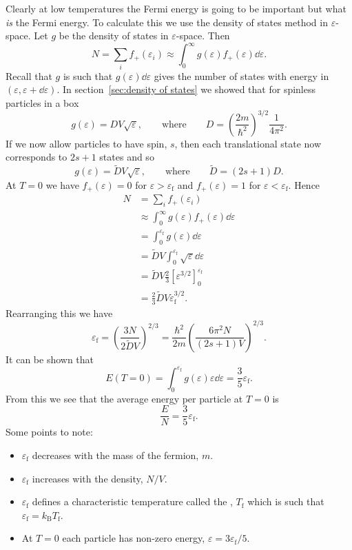 \documentclass[a4paper]{article}
\newcommand{\boltzmann}{k_\mathrm{B}}
\newcommand{\fermiEnergy}{\varepsilon_{\mathrm{f}}}
\newcommand{\fermiTemp}{T_{\mathrm{f}}}
\begin{document}
    Clearly at low temperatures the Fermi energy is going to be important but what \emph{is} the Fermi energy.
    To calculate this we use the density of states method in \(\varepsilon\)-space.
    Let \(g\) be the density of states in \(\varepsilon\)-space.
    Then
    \[N = \sum_i f_{+}(\varepsilon_i) \approx \int_{0}^{\infty} g(\varepsilon) f_{+}(\varepsilon) \dd{\varepsilon}.\]
    Recall that \(g\) is such that \(g(\varepsilon)\dd{\varepsilon}\) gives the number of states with energy in \((\varepsilon, \varepsilon + \dd{\varepsilon})\).
    In section~\ref{sec:density of states} we showed that for spinless particles in a box
    \[g(\varepsilon) = DV\sqrt{\varepsilon}, \qquad\text{where}\qquad D = \left( \frac{2m}{\hbar^2} \right)^{3/2}\frac{1}{4\pi^2}.\]
    If we now allow particles to have spin, \(s\), then each translational state now corresponds to \(2s + 1\) states and so
    \[g(\varepsilon) = \tilde{D}V\sqrt{\varepsilon}, \qquad\text{where}\qquad \tilde{D} = (2s + 1)D.\]
    At \(T = 0\) we have \(f_{+}(\varepsilon) = 0\) for \(\varepsilon > \fermiEnergy\) and \(f_{+}(\varepsilon) = 1\) for \(\varepsilon < \fermiEnergy\).
    Hence
    \begin{align*}
        N &= \sum_{i} f_{+}(\varepsilon_{i})\\
        &\approx \int_{0}^{\infty} g(\varepsilon)f_{+}(\varepsilon) \dd{\varepsilon}\\
        &= \int_{0}^{\fermiEnergy} g(\varepsilon)\dd{\varepsilon}\\
        &= \tilde{D}V \int_{0}^{\fermiEnergy} \sqrt{\varepsilon}\dd{\varepsilon}\\
        &= \tilde{D}V \frac{2}{3}\left[ \varepsilon^{3/2} \right]_{0}^{\fermiEnergy}\\
        &= \frac{2}{3}\tilde{D}V\fermiEnergy^{3/2}.
    \end{align*}
    Rearranging this we have
    \[\fermiEnergy = \left( \frac{3N}{2\tilde{D}V} \right)^{2/3} = \frac{\hbar^2}{2m}\left( \frac{6\pi^2N}{(2s + 1)V} \right)^{2/3}.\]
    It can be shown that
    \[E(T = 0) = \int_{0}^{\fermiEnergy}g(\varepsilon)\varepsilon\dd{\varepsilon} = \frac{3}{5}\fermiEnergy.\]
    From this we see that the average energy per particle at \(T = 0\) is
    \[\frac{E}{N} = \frac{3}{5}\fermiEnergy.\]
    Some points to note:
    \begin{itemize}
        \item \(\fermiEnergy\) decreases with the mass of the fermion, \(m\).
        \item \(\fermiEnergy\) increases with the density, \(N/V\).
        \item \(\fermiEnergy\) defines a characteristic temperature called the , \(\fermiTemp\) which is such that \(\fermiEnergy = \boltzmann \fermiTemp\).
        \item At \(T = 0\) each particle has non-zero energy, \(\varepsilon = 3\fermiEnergy/5\).
    \end{itemize}
    
\end{document}
